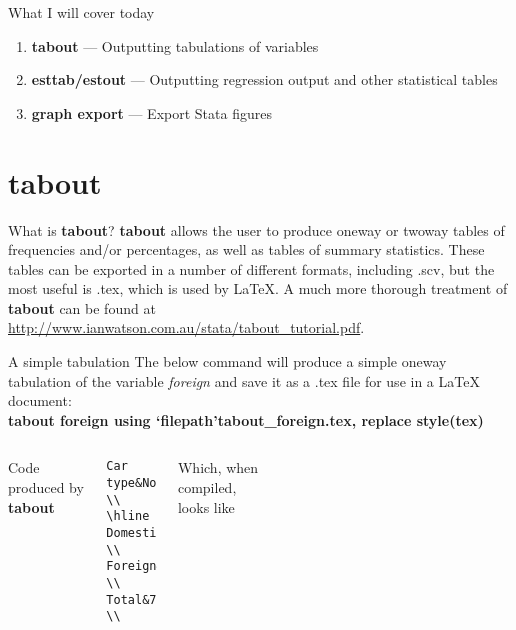 \documentclass[fleqn, table, 10pt]{beamer}
\def\results{S:/trainings/exporting_stata_tables_figures/results}
\begin{document}
\begin{frame}{What I will cover today}
    \begin{enumerate}
        \item \textbf{tabout} --- Outputting tabulations of variables
        \item \textbf{esttab/estout} --- Outputting regression output and other statistical tables
        \item \textbf{graph export} --- Export Stata figures
    \end{enumerate}
\end{frame}

\section{tabout}

\begin{frame}[fragile]{What is \textbf{tabout}?}
     \textbf{tabout} allows the user to produce oneway or twoway tables of frequencies and/or percentages, as well as tables of summary statistics. These tables can be exported in a number of different formats, including .scv, but the most useful is .tex, which is used by \LaTeX{}. A much more thorough treatment of \textbf{tabout} can be found at \url{http://www.ianwatson.com.au/stata/tabout_tutorial.pdf}.
\end{frame}

\begin{frame}[fragile]{A simple tabulation}
    The below command will produce a simple oneway tabulation of the variable \emph{foreign} and save it as a .tex file for use in a \LaTeX{} document: \\
    \vspace{.5cm}
    \textbf{tabout foreign using `filepath'tabout\_foreign.tex, replace style(tex)} \\ \pause
    \vspace{.5cm}
    \begin{columns}[t]
         Code produced by \textbf{tabout} \
            \begin{verbatim}
Car type&No. \\
\hline
Domestic&52.0 \\
Foreign&22.0 \\
Total&74.0 \\
            \end{verbatim}
            Which, when compiled, looks like \\
            \vspace{.25cm}
            \begin{tabular}{lr}
                
            \end{tabular}
    \end{columns}
\end{frame}
\end{document}
